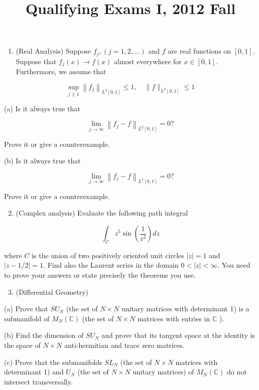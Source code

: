 \documentclass[10pt]{article}
\title{Qualifying Exams I, 2012 Fall }
\author{}
\date{}
\begin{document}
\maketitle
\begin{enumerate}
  \item (Real Analysis) Suppose $f_{j},(j=1,2, \ldots)$ and $f$ are real functions on $[0,1]$. Suppose that $f_{j}(x) \rightarrow f(x)$ almost everywhere for $x \in[0,1]$. Furthermore, we assume that
\end{enumerate}

$$
\sup _{j \geq 1}\left\|f_{j}\right\|_{L^{2}[0,1]} \leq 1, \quad\|f\|_{L^{2}[0,1]} \leq 1
$$

(a) Is it always true that

$$
\lim _{j \rightarrow \infty}\left\|f_{j}-f\right\|_{L^{2}[0,1]}=0 ?
$$

Prove it or give a counterexample.

(b) Is it always true that

$$
\lim _{j \rightarrow \infty}\left\|f_{j}-f\right\|_{L^{1}[0,1]}=0 ?
$$

Prove it or give a counterexample.

\begin{enumerate}
  \setcounter{enumi}{1}
  \item (Complex analysis) Evaluate the following path integral
\end{enumerate}

$$
\int_{C} z^{5} \sin \left(\frac{1}{z^{2}}\right) d z
$$

where $C$ is the union of two positively oriented unit circles $|z|=1$ and $|z-1 / 2|=1$. Find also the Laurent series in the domain $0<|z|<\infty$. You need to prove your answers or state precisely the theorems you use.

\begin{enumerate}
  \setcounter{enumi}{2}
  \item (Differential Geometry)
\end{enumerate}

(a) Prove that $S U_{N}$ (the set of $N \times N$ unitary matrices with determinant 1) is a submanifold of $M_{N}(\mathbb{C})$ (the set of $N \times N$ matrices with entries in $\mathbb{C}$ ).

(b) Find the dimension of $S U_{N}$ and prove that its tangent space at the identity is the space of $N \times N$ anti-hermitian and trace zero matrices.

(c) Prove that the submanifolds $S L_{N}$ (the set of $N \times N$ matrices with determinant 1) and $U_{N}$ (the set of $N \times N$ unitary matrices) of $M_{N}(\mathbb{C})$ do not intersect transversally.
\end{document}
